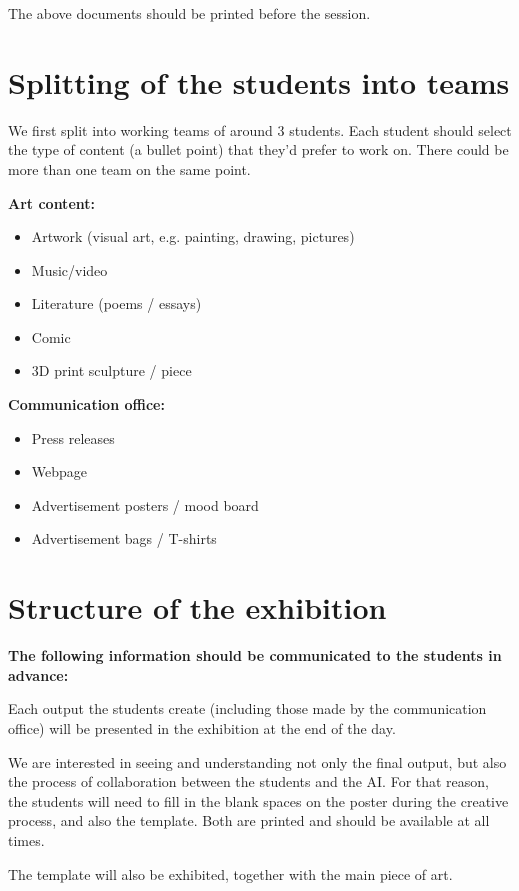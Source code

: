 \documentclass[12pt]{article}
\begin{document}
The above documents should be printed before the session.

\section{Splitting of the students into teams}

We first split into working teams of around 3 students. Each student should select the type of content (a bullet point) that they’d prefer to work on. There could be more than one team on the same point.

\textbf{Art content:}
\begin{itemize}
\item Artwork (visual art, e.g. painting, drawing, pictures)
\item Music/video
\item Literature (poems / essays)
\item Comic
\item 3D print sculpture / piece

\end{itemize}

\textbf{Communication office:}
\begin{itemize}
\item Press releases
\item Webpage
\item Advertisement posters / mood board
\item Advertisement bags / T-shirts
\end{itemize}

\section{Structure of the exhibition}

\textbf{The following information should be communicated to the students in advance:}

Each output the students create (including those made by the communication office) will be presented in the exhibition at the end of the day.

We are interested in seeing and understanding not only the final output, but also the process of collaboration between the students and the AI. For that reason, the students will need to fill in the blank spaces on the poster during the creative process, and also the template. Both are printed and should be available at all times. 

\begin{importantbox}
    The template will also be exhibited, together with the main piece of art.
\end{importantbox}
\end{document}
